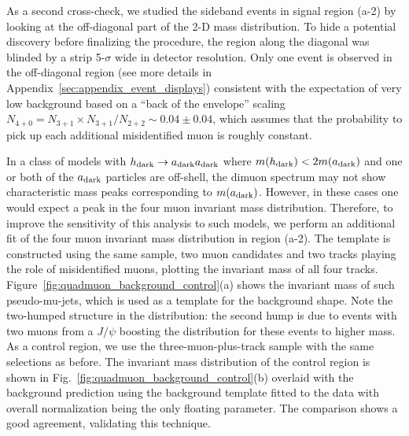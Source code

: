 As a second cross-check, we studied the sideband events in signal
region (a-2) by looking at the off-diagonal part of the 2-D mass
distribution. To hide a potential discovery before finalizing the
procedure, the region along the diagonal was blinded by a strip
5-$\sigma$ wide in detector resolution. Only one event is observed in
the off-diagonal region (see more details in Appendix~\ref{sec:appendix_event_displays}) consistent 
with the expectation of very low background based on a ``back of the envelope'' scaling 
$N_{4+0} = N_{3+1} \times N_{3+1}/N_{2+2} \sim 0.04\pm0.04$, which assumes that the probability 
to pick up each additional misidentified muon is roughly constant.

In a class of models with $h_{\mbox{\scriptsize dark}}\to a_{\mbox{\scriptsize dark}} a_{\mbox{\scriptsize dark}}$ where $m(h_{\mbox{\scriptsize dark}})<2m(a_{\mbox{\scriptsize dark}})$ and one or both of the $a_{\mbox{\scriptsize dark}}$ particles are off-shell, the dimuon spectrum may not show characteristic mass peaks corresponding to $m(a_{\mbox{\scriptsize dark}})$. However, in these cases one would expect a peak in the four muon invariant mass distribution. Therefore, to improve the sensitivity of this analysis to such models, we perform an additional fit of the four muon invariant mass distribution in region (a-2). The template is constructed using the same sample, two muon candidates and two tracks playing the role of misidentified muons, plotting the invariant mass of all four tracks. Figure~\ref{fig:quadmuon_background_control}(a) shows the invariant mass of such pseudo-mu-jets, which is used as a template for the background shape. Note the two-humped structure in the distribution: the second hump is due to events with two muons from a $J/\psi$ boosting the distribution for these events to higher mass. As a control region, we use the three-muon-plus-track sample with the same selections as before. The invariant mass distribution of the control region is shown in Fig.~\ref{fig:quadmuon_background_control}(b) overlaid with the background prediction using the background template fitted to the data with overall normalization being the only floating parameter. The comparison shows a good agreement, validating this technique.


